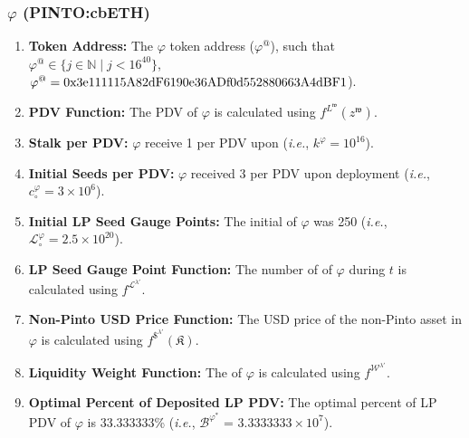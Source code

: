 \documentclass[class=article, crop=false]{standalone}
\begin{document}

\subsubsection{$\varphi$ (PINTO:cbETH)}

\begin{enumerate}

    \item \textbf{Token Address:} The $\varphi$ token address ($\varphi^{@}$), such that $\varphi^{@} \in \{j \in \mathbb{N} \mid j < 16^{40} \}$, $\varphi^{@} = \\ \text{0x3e111115A82dF6190e36ADf0d552880663A4dBF1}$).
    
    \item \textbf{PDV Function:} The PDV of $\varphi$ is calculated using $f^{L^{\mathfrak{w}}}(z^{\mathfrak{w}})$.
                
    \item \textbf{Stalk per PDV:} $\varphi$  receive 1  per PDV upon  (\textit{i.e.}, $k^{\varphi} = 10^{16}$).
    
    \item \textbf{Initial Seeds per PDV:} $\varphi$  received 3  per PDV upon deployment (\textit{i.e.}, ${c_{\circ}^{\varphi}} = 3 \times 10^6$).

    \item \textbf{Initial LP Seed Gauge Points:} The initial  of $\varphi$ was 250 (\textit{i.e.}, $\mathscr{L}_{\circ}^{\varphi} = 2.5 \times 10^{20}$).
    
    \item \textbf{LP Seed Gauge Point Function:} The number of  of $\varphi$ during $t$ is calculated using $f^{\mathscr{L}^{\lambda'}}$.

    \item \textbf{Non-Pinto USD Price Function:} The USD price of the non-Pinto asset in $\varphi$ is calculated using $f^{\$^{\lambda'}}(\mathfrak{K})$.
    
    \item \textbf{Liquidity Weight Function:} The  of $\varphi$ is calculated using $f^{\mathscr{W}^{\lambda'}}$.
    
    \item \textbf{Optimal Percent of Deposited LP PDV:} The optimal percent of  LP PDV of $\varphi$ is 33.333333\% (\textit{i.e.}, $\mathscr{B}^{\varphi^{*}}$ = $3.3333333 \times 10^{7}$).


\end{enumerate}
\end{document}
